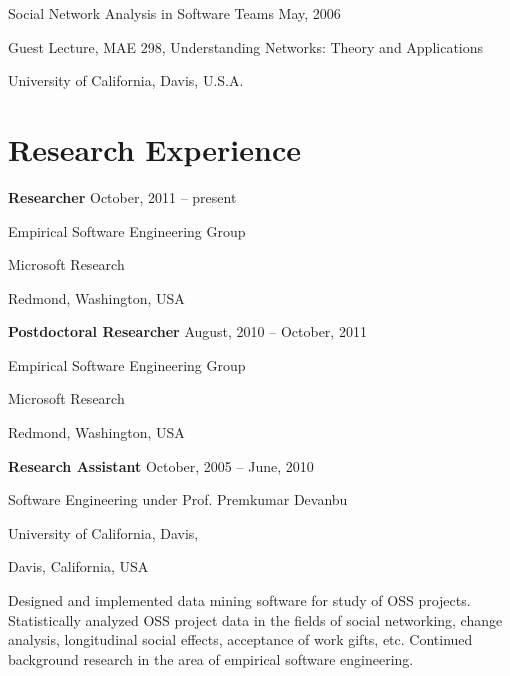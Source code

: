 \documentclass[margin,line,article,letterpaper]{res}
\newenvironment{list1}{
  \begin{list}{}{%
      \setlength{\itemsep}{0in}
      \setlength{\parsep}{0in} \setlength{\parskip}{0in}
      \setlength{\topsep}{0in} \setlength{\partopsep}{0in} 
      \setlength{\leftmargin}{0.17in}}}{\end{list}}
\newcommand{\timespan}[1]{#1}
\begin{document}
\begin{resume}
Social Network Analysis in Software Teams \hfill \timespan{May, 2006}\\
\vspace{-10pt}
\begin{list1}
\item Guest Lecture, MAE 298, Understanding Networks: Theory and Applications
\item University of California, Davis, U.S.A.
\end{list1}

\section{Research Experience}

\textbf{Researcher} \hfill \timespan{October, 2011 -- present}\\
\vspace{-10pt}
\begin{list1}
\item Empirical Software Engineering Group
\item Microsoft Research
\item Redmond, Washington, USA
\vspace{6pt}
\item  
\end{list1}


\textbf{Postdoctoral Researcher} \hfill \timespan{August, 2010 -- October, 2011}\\
\vspace{-10pt}
\begin{list1}
\item Empirical Software Engineering Group
\item Microsoft Research
\item Redmond, Washington, USA
\vspace{6pt}
\item  
\end{list1}

\textbf{Research Assistant} \hfill \timespan{October, 2005 -- June, 2010}\\
\vspace{-10pt}
\begin{list1}
\item Software Engineering under Prof. Premkumar Devanbu
\item University of California, Davis,
\item Davis, California, USA
\vspace{6pt}
\item Designed and implemented data mining software for study of OSS projects. Statistically 
analyzed OSS project data in the fields of social networking, change analysis, 
longitudinal social effects, acceptance of work gifts, etc. Continued background research in the 
area of empirical software engineering.
\end{list1}


\end{resume}
\end{document}
